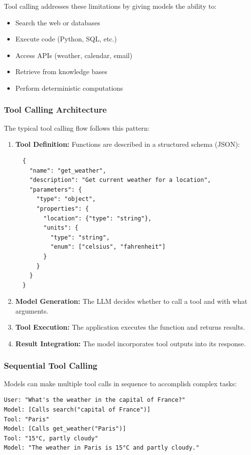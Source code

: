 \documentclass[class=article,crop=false]{standalone}
\begin{document}
Tool calling addresses these limitations by giving models the ability to:
\begin{itemize}
  \item Search the web or databases
  \item Execute code (Python, SQL, etc.)
  \item Access APIs (weather, calendar, email)
  \item Retrieve from knowledge bases
  \item Perform deterministic computations
\end{itemize}

\subsubsection{Tool Calling Architecture}

The typical tool calling flow follows this pattern:
\begin{enumerate}
  \item \textbf{Tool Definition:} Functions are described in a structured schema (JSON):
  \begin{verbatim}
  {
    "name": "get_weather",
    "description": "Get current weather for a location",
    "parameters": {
      "type": "object",
      "properties": {
        "location": {"type": "string"},
        "units": {
          "type": "string",
          "enum": ["celsius", "fahrenheit"]
        }
      }
    }
  }
  \end{verbatim}

  \item \textbf{Model Generation:} The LLM decides whether to call a tool and with what arguments.

  \item \textbf{Tool Execution:} The application executes the function and returns results.

  \item \textbf{Result Integration:} The model incorporates tool outputs into its response.
\end{enumerate}

\subsubsection{Sequential Tool Calling}

Models can make multiple tool calls in sequence to accomplish complex tasks:
\begin{verbatim}
User: "What's the weather in the capital of France?"
Model: [Calls search("capital of France")]
Tool: "Paris"
Model: [Calls get_weather("Paris")]
Tool: "15°C, partly cloudy"
Model: "The weather in Paris is 15°C and partly cloudy."
\end{verbatim}
\end{document}
